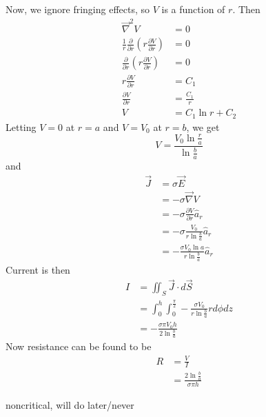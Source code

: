 \documentclass[answers]{exam}
\begin{document}
\begin{questions}
\begin{solution}
	Now, we ignore fringing effects, so $V$ is a function of $r$. Then
	\begin{align*}
		\vec \nabla^2 V &= 0 \\
		\frac{1}{r} \frac{\partial}{\partial r}\left(r\frac{\partial V}{\partial r}\right) &= 0 \\
		\frac{\partial}{\partial r}\left(r\frac{\partial V}{\partial r}\right) &= 0 \\
		r\frac{\partial V}{\partial r} &= C_1 \\
		\frac{\partial V}{\partial r} &= \frac{C_1}{r} \\
		V &= C_1\ln r + C_2
	\end{align*}
	Letting $V=0$ at $r=a$ and $V=V_0$ at $r=b$, we get
	$$V = \frac{V_0\ln\frac{r}{a}}{\ln\frac{b}{a}}$$
	and
	\begin{align*}
		\vec J &= \sigma \vec E \\
		       &= -\sigma \vec \nabla V \\
		       &= -\sigma \frac{\partial V}{\partial r} \hat a_r \\
		       &= -\sigma \frac{V_0}{r\ln\frac{b}{a}} \hat a_r \\
		       &= -\frac{\sigma V_0\ln a}{r\ln\frac{b}{a}} \hat a_r
	\end{align*}
	Current is then
	\begin{align*}
		I &= \iint_S \vec J \cdot d\vec S \\
		  &= \int_0^h \int_0^{\frac{\pi}{2}} -\frac{\sigma V_0}{r\ln\frac{b}{a}} rd\phi dz \\
		  &= -\frac{\sigma\pi V_0h}{2\ln\frac{b}{a}}
	\end{align*}
	Now resistance can be found to be
	\begin{align*}
		R &= \frac{V}{I} \\
		  &= \frac{2\ln\frac{b}{a}}{\sigma\pi h}
	\end{align*}
\end{solution}


\begin{solution}
	noncritical, will do later/never
\end{solution}


\end{questions}
\end{document}
